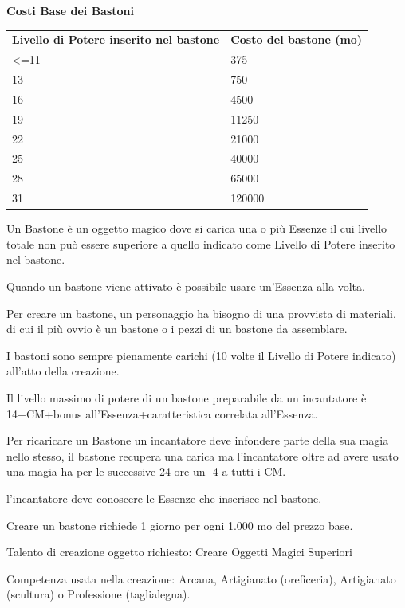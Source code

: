 \documentclass[a4paper,11pt,twoside,openany]{book}
\begin{document}
\textbf{Costi Base dei Bastoni}

\bigskip

\begin{tabular}{ll}
	\toprule
	\textbf{Livello di Potere inserito nel bastone} & \textbf{Costo del bastone (mo)}\\
	\textless=11    & 375\\
	13              & 750\\
	16              & 4500\\
	19              & 11250\\
	22              & 21000\\
	25              & 40000\\
	28              & 65000\\
	31              & 120000\\
\end{tabular}

\bigskip

Un Bastone è un oggetto magico dove si carica una o più Essenze il cui livello totale non può essere superiore a quello indicato come Livello di Potere inserito nel bastone.

Quando un bastone viene attivato è possibile usare un'Essenza alla volta.

Per creare un bastone, un personaggio ha bisogno di una provvista di materiali, di cui il più ovvio è un bastone o i pezzi di un bastone da assemblare.

I bastoni sono sempre pienamente carichi (10 volte il Livello di Potere indicato) all'atto della creazione.

Il livello massimo di potere di un bastone preparabile da un incantatore è 14+CM+bonus all'Essenza+caratteristica correlata all'Essenza.

Per ricaricare un Bastone un incantatore deve infondere parte della sua magia nello stesso, il bastone recupera una carica ma l'incantatore oltre ad avere usato una magia ha per le successive 24 ore un -4 a tutti i CM.

l'incantatore deve conoscere le Essenze che inserisce nel bastone.

Creare un bastone richiede 1 giorno per ogni 1.000 mo del prezzo base.

Talento di creazione oggetto richiesto: Creare Oggetti Magici Superiori

Competenza usata nella creazione: Arcana, Artigianato (oreficeria), Artigianato (scultura) o Professione (taglialegna).

\pagebreak
\end{document}
